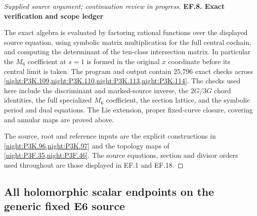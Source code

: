 \begin{proof}[Supplied source argument; continuation review in progress]
\medskip\noindent\textbf{EF.8. Exact verification and scope ledger}

\par\nobreak

The exact algebra is evaluated by factoring rational functions over the
displayed source equation, using symbolic matrix multiplication for the full
central cochain, and computing the determinant of the ten-class intersection
matrix. In particular the $M_6$ coefficient at $s=1$ is formed in the original
$x$ coordinate before its central limit is taken. The program
 and output  contain 25,796 exact
checks across \cref{night:P3K.109,night:P3K.110,night:P3K.113,night:P3K.114}.
The checks used here include the discriminant and marked-source inverse, the
$2G/3G$ chord identities, the full specialized $M_6$ coefficient, the section
lattice, and the symbolic period and dual equations. The Lie extension,
proper fixed-curve closure, covering and annular maps are proved above.

The source, root and reference inputs are the explicit constructions in
\cref{night:P3K.96,night:P3K.97} and the topology maps of
\cref{night:P3F.35,night:P3F.46}. The source equations, section and divisor
orders used throughout are those displayed in EF.1 and EF.18.






\end{proof}


\subsection{All holomorphic scalar endpoints on the generic fixed E6 source}
